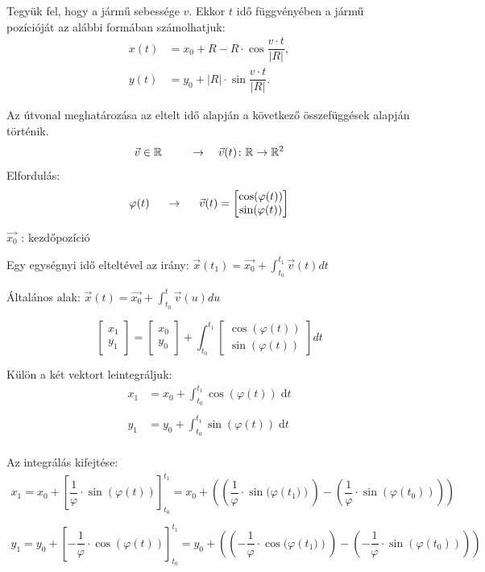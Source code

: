 Tegyük fel, hogy a jármű sebessége $v$. Ekkor $t$ idő függvényében a jármű pozícióját az alábbi formában számolhatjuk:
\begin{align*}
x(t) &= x_0 + R - R \cdot \cos \dfrac{v \cdot t}{|R|}, \\
y(t) &= y_0 + |R| \cdot \sin \dfrac{v \cdot t}{|R|}.
\end{align*}


Az útvonal meghatározása az eltelt idő alapján a következő összefüggések alapján történik.
$$
\vec{v} \in \mathbb{R} \hspace{0.5cm}
\quad \rightarrow \quad
\vec{v} (t) \colon \mathbb{R} \to \mathbb{R}^2
$$
Elfordulás:
$$
\varphi (t) \hspace{0.5cm} \rightarrow \hspace{0.5cm} \vec{v} (t) =
\begin{bmatrix}
\cos(\varphi(t)) \\
\sin(\varphi(t))
\end{bmatrix}
$$

$ \vec{x_0} $ : kezdőpozíció

Egy egységnyi idő elteltével az irány: $ \vec{x} (t_1) = \vec{x_0} + \displaystyle\int_{t_0}^{t_1} \vec{v} (t) dt $

Általános alak:  $ \vec{x} (t) = \vec{x_0} + \displaystyle\int_{t_0}^{t} \vec{v} (u) du $

$$
\begin{bmatrix} x_1 \\ y_1 \end{bmatrix} = \begin{bmatrix} x_0 \\ y_0 \end{bmatrix} + \displaystyle\int_{t_0}^{t_1} \begin{bmatrix} \cos(\varphi(t)) \\ \sin(\varphi(t)) \end{bmatrix} dt 
$$

Külön a két vektort leintegráljuk:
\begin{align*}
x_1 &= x_0 + \displaystyle\int_{t_0}^{t_1} \cos(\varphi(t)) \; \mathrm{d}t \\ \\
y_1 &= y_0 + \displaystyle\int_{t_0}^{t_1} \sin(\varphi(t)) \; \mathrm{d}t \\
\end{align*}

Az integrálás kifejtése:
\begin{align*}
x_1 = x_0 + \left[\dfrac{1}{\varphi} \cdot \sin(\varphi(t))\right]_{t_0}^{t_1} = x_0 + \left(\left(\dfrac{1}{\varphi} \cdot \sin(\varphi({t_1)})\right) - \left(\dfrac{1}{\varphi} \cdot \sin(\varphi({t_0}))\right)\right)  \\ \\
y_1 = y_0 + \left[- \dfrac{1}{\varphi} \cdot \cos(\varphi(t))\right]_{t_0}^{t_1} = y_0 + \left(\left(- \dfrac{1}{\varphi} \cdot \cos(\varphi({t_1)})\right) - \left(- \dfrac{1}{\varphi} \cdot \sin(\varphi({t_0}))\right)\right) \\
\end{align*}

